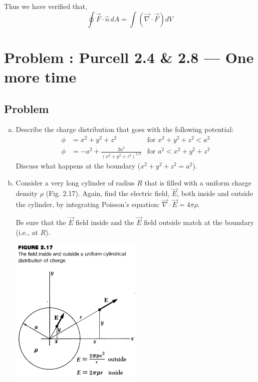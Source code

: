 \documentclass[solutions]{esg8022pset}
\begin{document}
  Thus we have verified that,
  $$\oint \vec{F}\cdot\hat{n}\,dA = \int (\vec{\nabla}\cdot\vec{F}) dV$$
\section{Problem \thesection: Purcell 2.4 \& 2.8 --- One more time}
\subsection{Problem}
  \begin{enumerate}[(a)]
    \item Describe the charge distribution that goes with the following potential:
      \begin{align*}
        \phi & = x^2 + y^2 + z^2 & \text{for }x^2 + y^2 + z^2 < a^2 \\
        \phi & = -a^2 + \frac{2a^3}{(x^2 + y^2 + z^2)^{1/2}} & \text{for }a^2 < x^2 + y^2 + z^2
      \end{align*}
      Discuss what happens at the boundary ($x^2 + y^2 + z^2 = a^2$).
    \item Consider a very long cylinder of radius $R$ that is filled with a uniform charge density $\rho$ (Fig. 2.17).  Again, find the electric field, $\vec{E}$, both inside and outside the cylinder, by integrating Poisson's equation: $\vec{\nabla} \cdot \vec{E} = 4 \pi \rho$.

      Be sure that the $\vec E$ field inside and the $\vec E$ field outside match at the boundary (i.e., at $R$).
      \begin{center}\includegraphics[width=0.5\textwidth]{ps02_2}\end{center}
  \end{enumerate}
\end{document}
